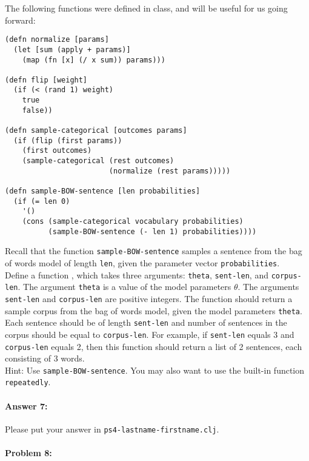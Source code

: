 \documentclass[10pt]{article}
\newcommand{\required}[1]{{\color{blue}{#1}}}
\newcommand{\PSnum}{4}
\begin{document}
 The following functions were defined in class, and will be
useful for us going forward:

\begin{lstlisting}
(defn normalize [params]
  (let [sum (apply + params)]
    (map (fn [x] (/ x sum)) params)))

(defn flip [weight]
  (if (< (rand 1) weight)
    true
    false))

(defn sample-categorical [outcomes params]
  (if (flip (first params))
    (first outcomes)
    (sample-categorical (rest outcomes) 
                        (normalize (rest params)))))

(defn sample-BOW-sentence [len probabilities]
  (if (= len 0)
    '()
    (cons (sample-categorical vocabulary probabilities)
          (sample-BOW-sentence (- len 1) probabilities))))
\end{lstlisting}

 Recall that the function \texttt{sample-BOW-sentence}
samples a sentence from the bag of words model of length \texttt{len},
given the parameter vector \texttt{probabilities}.  \\

 Define a function \required{\texttt{sample-BOW-corpus}},
which takes three arguments: \texttt{theta}, \texttt{sent-len}, and
\texttt{corpus-len}. The argument \texttt{theta} is a value of the
model parameters $\theta$. The arguments \texttt{sent-len} and
\texttt{corpus-len} are positive integers. The function should return
a sample corpus from the bag of words model, given the model
parameters \texttt{theta}. Each sentence should be of length
\texttt{sent-len} and number of sentences in the corpus should be
equal to \texttt{corpus-len}. For example, if \texttt{sent-len} equals
3 and \texttt{corpus-len} equals 2, then this function should return a
list of 2 sentences, each consisting of 3 words.  \\

 Hint: Use \texttt{sample-BOW-sentence}. You may also want to
use the built-in function \texttt{repeatedly}.

\paragraph{Answer 7:} Please put your answer in
\texttt{ps\PSnum-lastname-firstname.clj}.

\hrulefill %

\paragraph{Problem 8:}
\end{document}
